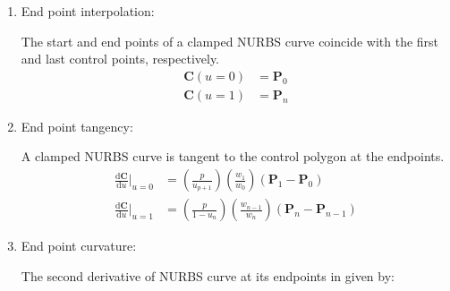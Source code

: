 \begin{enumerate}
    \item End point interpolation:
    
    The start and end points of a clamped NURBS curve coincide with the first and last control points, respectively.
    \begin{align*}
        \mathbf{C}(u=0) &= \mathbf{P}_{0} \\
        \mathbf{C}(u=1) &= \mathbf{P}_{n}
    \end{align*}
    
    
    \item End point tangency:
    
    A clamped NURBS curve is tangent to the control polygon at the endpoints.
    \begin{align*}
        \frac{\mathrm{d}\mathbf{C}}{\mathrm{d}u}\Bigr|_{u=0} &= \left(\frac{p}{u_{p+1}}\right) \left(\frac{w_{1}}{w_{0}}\right) (\mathbf{P}_{1} - \mathbf{P}_{0}) \\
        \frac{\mathrm{d}\mathbf{C}}{\mathrm{d}u}\Bigr|_{u=1} &= \left(\frac{p}{1-u_{n}}\right) \left(\frac{w_{n-1}}{w_{n}}\right) (\mathbf{P}_{n} - \mathbf{P}_{n-1})
    \end{align*}
    
    \item End point curvature:
    
    The second derivative of NURBS curve at its endpoints in given by: \\


\end{enumerate}
